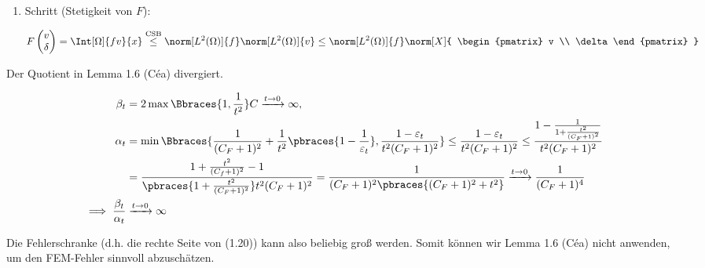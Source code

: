 \begin{solution}
\begin{enumerate}[label = \textbf{\alph*)}]
\begin{enumerate}[label = \arabic*.]
    \item Schritt (Stetigkeit von $F$):
    
    \begin{align*}
      F
      \begin{pmatrix}
        v \\ \delta
      \end{pmatrix}
      =
      \Int[\Omega]{f v}{x}
      \stackrel
      {
        \mathrm{CSB}
      }{\leq}
      \norm[L^2(\Omega)]{f}
      \norm[L^2(\Omega)]{v}
      \leq
      \norm[L^2(\Omega)]{f}
      \norm[X]
      {
        \begin{pmatrix}
          v \\ \delta
        \end{pmatrix}
      }
    \end{align*}

  \end{enumerate}


  Der Quotient in Lemma 1.6 (Céa) divergiert.

  \begin{align*}
    \beta_t
    & =
    2 \max \Bbraces{1, \frac{1}{t^2}} C
    \xrightarrow{t \to 0}
    \infty, \\
    \alpha_t
    & =
    \min
    \Bbraces
    {
      \frac{1}{(C_F + 1)^2}
      +
      \frac{1}{t^2}
      \pbraces
      {
        1 - \frac{1}{\varepsilon_t}
      },
      \frac
      {
        1 - \varepsilon_t
      }{
        t^2 (C_F + 1)^2
      }
    }
    \leq
    \frac
    {
      1 - \varepsilon_t
    }{
      t^2 (C_F + 1)^2
    }
    \leq
    \frac
    {
      1
      -
      \frac{1}
      {
        1
        +
        \frac{t^2}{(C_F + 1)^2}
      }
    }{
      t^2 (C_F + 1)^2
    } \\
    & =
    \frac
    {
      1 + \frac{t^2}{(C_f + 1)^2} - 1
    }{
      \pbraces
      {
        1 + \frac{t^2}{(C_F + 1)^2}
      }
      t^2 (C_F + 1)^2
    }
    =
    \frac{1}
    {
      (C_F + 1)^2
      \pbraces
      {
        (C_F + 1)^2 + t^2
      }
    }
    \xrightarrow{t \to 0}
    \frac{1}{(C_F + 1)^4} \\
    \implies
    \frac{\beta_t}{\alpha_t}
    & \xrightarrow{t \to 0}
    \infty
  \end{align*}

  Die Fehlerschranke (d.h. die rechte Seite von (1.20)) kann also beliebig groß werden.
  Somit können wir Lemma 1.6 (Céa) nicht anwenden, um den FEM-Fehler sinnvoll abzuschätzen.

\end{enumerate}

\end{solution}

